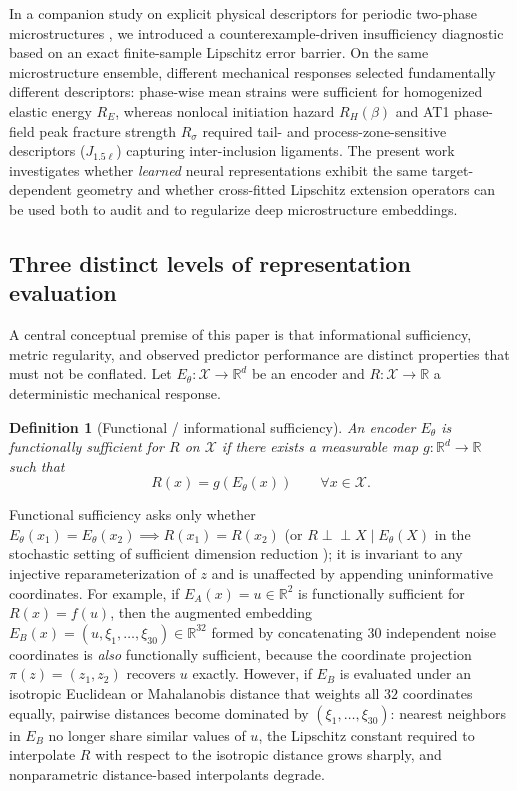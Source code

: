 \documentclass[preprint,11pt,a4paper]{elsarticle}
\newtheorem{definition}{Definition}
\newcommand{\R}{\mathbb{R}}
\newcommand{\X}{\mathcal{X}}
\begin{document}
In a companion study on explicit physical descriptors for periodic two-phase microstructures \cite{GomezOvalle2026}, we introduced a counterexample-driven insufficiency diagnostic based on an exact finite-sample Lipschitz error barrier. On the same microstructure ensemble, different mechanical responses selected fundamentally different descriptors: phase-wise mean strains were sufficient for homogenized elastic energy $R_E$, whereas nonlocal initiation hazard $R_H(\beta)$ and AT1 phase-field peak fracture strength $R_\sigma$ required tail- and process-zone-sensitive descriptors ($J_{1.5\ell}$) capturing inter-inclusion ligaments. The present work investigates whether \emph{learned} neural representations exhibit the same target-dependent geometry and whether cross-fitted Lipschitz extension operators can be used both to audit and to regularize deep microstructure embeddings.

\subsection{Three distinct levels of representation evaluation}
\label{sec:three_levels}

A central conceptual premise of this paper is that informational sufficiency, metric regularity, and observed predictor performance are distinct properties that must not be conflated. Let $E_\theta:\X\to\R^d$ be an encoder and $R:\X\to\R$ a deterministic mechanical response.

\begin{definition}[Functional / informational sufficiency]
\label{def:sufficiency}
An encoder $E_\theta$ is \emph{functionally sufficient} for $R$ on $\X$ if there exists a measurable map $g:\R^d\to\R$ such that
\begin{equation}
R(x)=g(E_\theta(x))
\qquad\forall x\in\X.
\end{equation}
\end{definition}

Functional sufficiency asks only whether $E_\theta(x_1)=E_\theta(x_2)\implies R(x_1)=R(x_2)$ (or $R\perp\!\!\!\perp X\mid E_\theta(X)$ in the stochastic setting of sufficient dimension reduction \cite{Huang2024}); it is invariant to any injective reparameterization of $z$ and is unaffected by appending uninformative coordinates. For example, if $E_A(x)=u\in\R^2$ is functionally sufficient for $R(x)=f(u)$, then the augmented embedding $E_B(x)=(u,\xi_1,\dots,\xi_{30})\in\R^{32}$ formed by concatenating $30$ independent noise coordinates is \emph{also} functionally sufficient, because the coordinate projection $\pi(z)=(z_1,z_2)$ recovers $u$ exactly. However, if $E_B$ is evaluated under an isotropic Euclidean or Mahalanobis distance that weights all $32$ coordinates equally, pairwise distances become dominated by $(\xi_1,\dots,\xi_{30})$: nearest neighbors in $E_B$ no longer share similar values of $u$, the Lipschitz constant required to interpolate $R$ with respect to the isotropic distance grows sharply, and nonparametric distance-based interpolants degrade.
\end{document}
